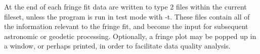 At the end of each fringe fit data are written to type 2
files within the current fileset, unless the program is
run in test mode with -t. These files contain all of the
information relevant to the fringe fit, and become the
input for subsequent astronomic or geodetic processing.
Optionally, a fringe plot may be popped up in a window,
or perhaps printed, in order to facilitate data quality
analysis.

